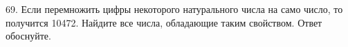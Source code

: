 69. Если перемножить цифры некоторого натурального числа на само число, то получится 10472. Найдите все числа, обладающие таким свойством. Ответ обоснуйте.\\
